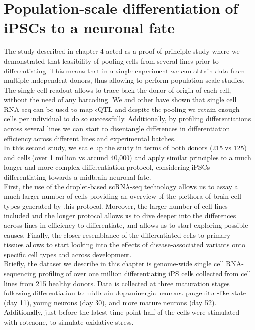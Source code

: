 
\chapter{Population-scale differentiation of iPSCs to a neuronal fate}

The study described in chapter 4 acted as a proof of principle study where we demonstrated that feasibility of pooling cells from several lines prior to differentiating.
This means that in a single experiment we can obtain data from multiple independent donors, thus allowing to perform population-scale studies.
The single cell readout allows to trace back the donor of origin of each cell, without the need of any barcoding.
We and other have shown that single cell RNA-seq can be used to map eQTL and despite the pooling we retain enough cells per individual to do so successfully.
Additionally, by profiling differentiations across several lines we can start to disentangle differences in differentiation efficiency across different lines and experimental batches.\\

In this second study, we scale up the study in terms of both donors (215 vs 125) and cells (over 1 million vs around 40,000) and apply similar principles to a much longer and more complex differentiation protocol, considering iPSCs differentiating towards a midbrain neuronal fate.\\

First, the use of the droplet-based scRNA-seq technology allows us to assay a much larger number of cells providing an overview of the plethora of brain cell types generated by this protocol. 
Moreover, the larger number of cell lines included and the longer protocol allows us to dive deeper into the differences across lines in efficiency to differentiate, and allows us to start exploring possible causes.
Finally, the closer resemblance of the differentiated cells to primary tissues allows to start looking into the effects of disease-associated variants onto specific cell types and across development. \\

Briefly, the dataset we describe in this chapter is genome-wide single cell RNA-sequencing profiling of over one million differentiating iPS cells collected from cell lines from 215 healthy donors. 
Data is collected at three maturation stages following differentiation to midbrain dopaminergic neurons: progenitor-like state (day 11), young neurons (day 30), and more mature neurons (day 52). 
Additionally, just before the latest time point half of the cells were stimulated with rotenone, to simulate oxidative stress. 

